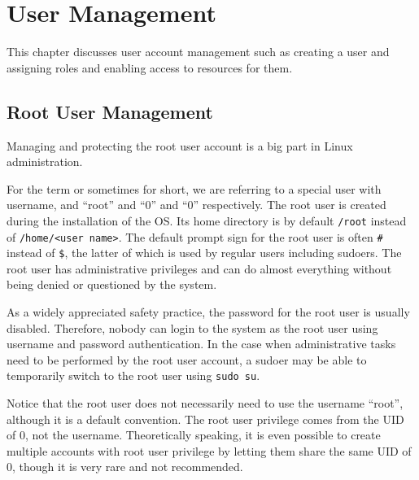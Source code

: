 \chapter{User Management} \label{ch:usermanagement}

This chapter discusses user account management such as creating a user and assigning roles and enabling access to resources for them.

\section{Root User Management}

Managing and protecting the root user account is a big part in Linux administration. 

For the term  or sometimes  for short, we are referring to a special user with username,  and  ``root'' and ``0'' and ``0'' respectively. The root user is created during the installation of the OS. Its home directory is by default \verb|/root| instead of \verb|/home/<user name>|. The default prompt sign for the root user is often \verb|#| instead of \verb|$|, the latter of which is used by regular users including sudoers. The root user has administrative privileges and can do almost everything without being denied or questioned by the system. 

As a widely appreciated safety practice, the password for the root user is usually disabled. Therefore, nobody can login to the system as the root user using username and password authentication. In the case when administrative tasks need to be performed by the root user account, a sudoer may be able to temporarily switch to the root user using \verb|sudo su|.

Notice that the root user does not necessarily need to use the username ``root'', although it is a default convention. The root user privilege comes from the UID of 0, not the username. Theoretically speaking, it is even possible to create multiple accounts with root user privilege by letting them share the same UID of 0, though it is very rare and not recommended.

